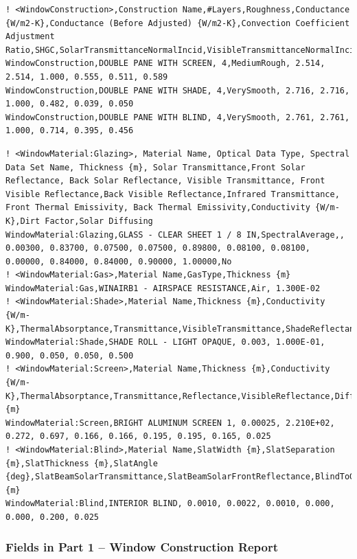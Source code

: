 \begin{lstlisting}
! <WindowConstruction>,Construction Name,#Layers,Roughness,Conductance {W/m2-K},Conductance (Before Adjusted) {W/m2-K},Convection Coefficient Adjustment Ratio,SHGC,SolarTransmittanceNormalIncid,VisibleTransmittanceNormalIncid
WindowConstruction,DOUBLE PANE WITH SCREEN, 4,MediumRough, 2.514, 2.514, 1.000, 0.555, 0.511, 0.589
WindowConstruction,DOUBLE PANE WITH SHADE, 4,VerySmooth, 2.716, 2.716, 1.000, 0.482, 0.039, 0.050
WindowConstruction,DOUBLE PANE WITH BLIND, 4,VerySmooth, 2.761, 2.761, 1.000, 0.714, 0.395, 0.456
\end{lstlisting}
\begin{lstlisting}
! <WindowMaterial:Glazing>, Material Name, Optical Data Type, Spectral Data Set Name, Thickness {m}, Solar Transmittance,Front Solar Reflectance, Back Solar Reflectance, Visible Transmittance, Front Visible Reflectance,Back Visible Reflectance,Infrared Transmittance, Front Thermal Emissivity, Back Thermal Emissivity,Conductivity {W/m-K},Dirt Factor,Solar Diffusing
WindowMaterial:Glazing,GLASS - CLEAR SHEET 1 / 8 IN,SpectralAverage,, 0.00300, 0.83700, 0.07500, 0.07500, 0.89800, 0.08100, 0.08100, 0.00000, 0.84000, 0.84000, 0.90000, 1.00000,No
! <WindowMaterial:Gas>,Material Name,GasType,Thickness {m}
WindowMaterial:Gas,WINAIRB1 - AIRSPACE RESISTANCE,Air, 1.300E-02
! <WindowMaterial:Shade>,Material Name,Thickness {m},Conductivity {W/m-K},ThermalAbsorptance,Transmittance,VisibleTransmittance,ShadeReflectance
WindowMaterial:Shade,SHADE ROLL - LIGHT OPAQUE, 0.003, 1.000E-01, 0.900, 0.050, 0.050, 0.500
! <WindowMaterial:Screen>,Material Name,Thickness {m},Conductivity {W/m-K},ThermalAbsorptance,Transmittance,Reflectance,VisibleReflectance,DiffuseReflectance,DiffuseVisibleReflectance,ScreenMaterialDiameterToSpacingRatio,ScreenToGlassDistance {m}
WindowMaterial:Screen,BRIGHT ALUMINUM SCREEN 1, 0.00025, 2.210E+02, 0.272, 0.697, 0.166, 0.166, 0.195, 0.195, 0.165, 0.025
! <WindowMaterial:Blind>,Material Name,SlatWidth {m},SlatSeparation {m},SlatThickness {m},SlatAngle {deg},SlatBeamSolarTransmittance,SlatBeamSolarFrontReflectance,BlindToGlassDistance {m}
WindowMaterial:Blind,INTERIOR BLIND, 0.0010, 0.0022, 0.0010, 0.000, 0.000, 0.200, 0.025
\end{lstlisting}

\subsubsection{Fields in Part 1 -- Window Construction Report}\label{fields-in-part-1-window-construction-report}

